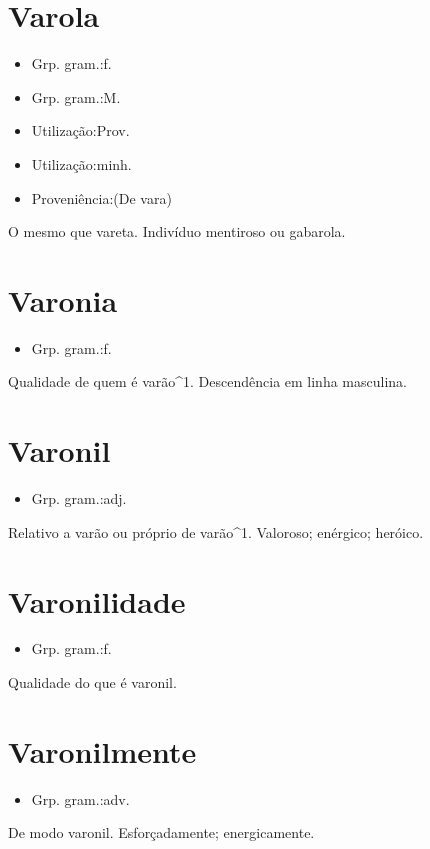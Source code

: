 \documentclass{article}
\begin{document}
\section{Varola}
\begin{itemize}
\item {Grp. gram.:f.}
\end{itemize}
\begin{itemize}
\item {Grp. gram.:M.}
\end{itemize}
\begin{itemize}
\item {Utilização:Prov.}
\end{itemize}
\begin{itemize}
\item {Utilização:minh.}
\end{itemize}
\begin{itemize}
\item {Proveniência:(De \textunderscore vara\textunderscore )}
\end{itemize}
O mesmo que \textunderscore vareta\textunderscore .
Indivíduo mentiroso ou gabarola.
\section{Varonia}
\begin{itemize}
\item {Grp. gram.:f.}
\end{itemize}
Qualidade de quem é varão^1.
Descendência em linha masculina.
\section{Varonil}
\begin{itemize}
\item {Grp. gram.:adj.}
\end{itemize}
Relativo a varão ou próprio de varão^1.
Valoroso; enérgico; heróico.
\section{Varonilidade}
\begin{itemize}
\item {Grp. gram.:f.}
\end{itemize}
Qualidade do que é varonil.
\section{Varonilmente}
\begin{itemize}
\item {Grp. gram.:adv.}
\end{itemize}
De modo varonil.
Esforçadamente; energicamente.
\end{document}
